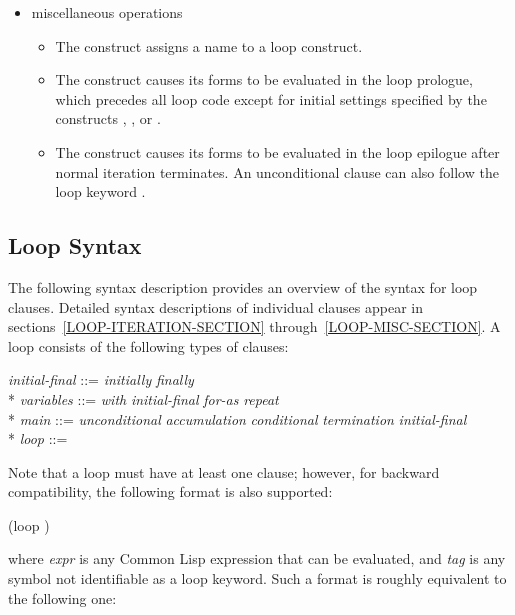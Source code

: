 \begin{itemize}
  \item miscellaneous operations

  \begin{itemize}
  \item The  construct assigns a name to a loop construct.

  \item The  construct causes its forms to be evaluated
   in the loop prologue, which precedes all loop code except for initial 
   settings specified by the constructs , , or .

  \item  The  construct causes its forms to be evaluated
   in the loop epilogue after normal iteration terminates.  An unconditional
   clause can also follow the loop keyword .
  \end{itemize}
  \end{itemize}



  \subsection{Loop Syntax}

  The following syntax description provides an overview of the syntax
  for loop clauses.  Detailed syntax descriptions of individual clauses
  appear in sections~\ref{LOOP-ITERATION-SECTION} through~\ref{LOOP-MISC-SECTION}.
  A loop consists of the
  following types of clauses:

\begin{tabbing}
{\it initial-final\/} ::= {\it initially\/} {\Mor} {\it finally\/} \\*
{\it variables\/} ::= {\it with\/} {\Mor} {\it initial-final\/} {\Mor} {\it for-as\/} {\Mor} {\it repeat} \\*
{\it main\/} ::= {\it unconditional\/} {\Mor} {\it accumulation\/} {\Mor} {\it conditional\/} 
      {\Mor} {\it termination\/} {\Mor} {\it initial-final\/} \\*
{\it loop\/} ::= 
\end{tabbing}

Note that a loop must have at least one clause; however, for
backward compatibility, the following format is also supported:
\begin{lisp}
(loop )
\end{lisp}
where {\it expr} is any Common Lisp expression that can be evaluated, and 
{\it tag} is any symbol not identifiable as a loop keyword.  Such a format
is roughly equivalent to the following one:


